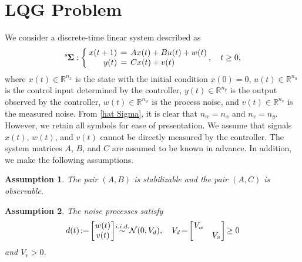 \documentclass[preprint,5p,times,twocolumn]{elsarticle}
\newcommand{\bm}[1]{{\mbox{\boldmath $#1$}}}
\newtheorem{assumption}{Assumption}
\def\rms{{}^{\rm s}\hspace{-0.2mm}}
\def\h{\hspace{-0.5mm}}
\def\H{\hspace{-1.0mm}}
\def\HH{\hspace{-2.0mm}}
\begin{document}
\section{LQG Problem}\label{sec2}
We consider a discrete-time linear system described as 
\begin{equation}\label{hat Sigma}
\rms{\bm \Sigma}: 
\left\{\H
\begin{array}{rcl}
    x(t+1) \HH &=& \HH Ax(t)+B u(t) + w(t)\\
    y(t) \HH &=& \HH Cx(t) +v(t)
\end{array}
\right.\HH , \quad t \geq 0,
\end{equation}
where $x(t) \in {\mathbb R}^{n_x}$ is the state with the initial condition $x(0) = 0$, $u(t) \in \mathbb R^{n_u}$ is the control input determined by the controller, 
$y(t) \in {\mathbb R}^{n_y}$ is the output observed by the controller, $w(t) \in \mathbb R^{n_w}$ is the process noise, and $v(t) \in \mathbb R^{n_v}$ is the measured noise. From \eqref{hat Sigma}, it is clear that $n_w = n_x$ and $n_v = n_y$. However, we retain all symbols for ease of presentation. We assume that signals $x(t)$, $w(t)$, and $v(t)$ cannot be directly measured by the controller. The system matrices $A$, $B$, and $C$ are assumed to be known in advance. In addition, we make the following assumptions. 
\begin{assumption}\label{ass_ABC}
The pair $(A,B)$ is stabilizable and the pair $(A,C)$ is observable. 
\end{assumption}
\begin{assumption}\label{ass_wv}
The noise processes satisfy
\begin{align}
    d(t) \h := \h \left[\hspace{-1.5mm}\begin{array}{c} w(t) \\ v(t) \end{array}\hspace{-1.5mm}\right]
    \hspace{-1mm} \overset{i.i.d.}{\sim}\hspace{-1mm} \mathcal N(0, V_d), \quad V_d \hspace{-0.5mm}=\hspace{-0.5mm} \left[\hspace{-1.5mm}\begin{array}{cc}V_w &  \\  & V_v \end{array}\hspace{-1.5mm}\right] \h \geq  0\label{def_d}
\end{align}
and $V_v > 0$. 
\end{assumption}
\end{document}
